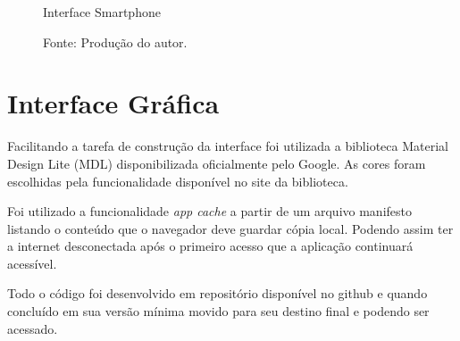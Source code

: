 \begin{figure}[h]
  \caption{Interface Smartphone}\label{fig:ui-phone}
  \centering
  \setlength{\fboxsep}{0pt}%
\setlength{\fboxrule}{1pt}%
  \caption*{\footnotesize Fonte: Produção do autor.}
\end{figure}

\section{Interface Gráfica}

Facilitando a tarefa de construção da interface foi utilizada a biblioteca Material Design Lite (MDL)\nocite{mdl} disponibilizada oficialmente pelo Google. As cores foram escolhidas pela funcionalidade disponível no site da biblioteca.

Foi utilizado a funcionalidade \textit{app cache} a partir de um arquivo manifesto listando o conteúdo que o navegador deve guardar cópia local. Podendo assim ter a internet desconectada após o primeiro acesso que a aplicação continuará acessível.

Todo o código foi desenvolvido em repositório disponível no github e quando concluído em sua versão mínima movido para seu destino final e podendo ser acessado.\nocite{bizual}\color{black}

